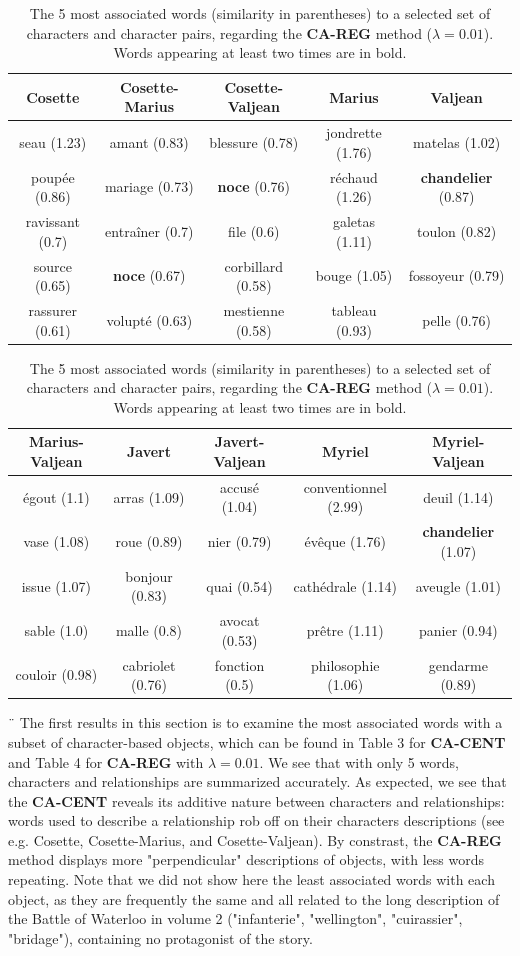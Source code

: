 \documentclass[
twocolumn,
]{ceurart}
\begin{document}
\begin{table}[!bh]
	\centering
	\begin{tabular}{|c|c|c|c|c|}
		\hline
		Cosette & Cosette-Marius & Cosette-Valjean & Marius & Valjean \\ \hline
		seau (1.23) & amant (0.83) & blessure (0.78) & jondrette (1.76) & matelas (1.02) \\ \hline
		poupée (0.86) & mariage (0.73) & \textbf{noce} (0.76) & réchaud (1.26) & \textbf{chandelier} (0.87) \\ \hline
		ravissant (0.7) & entraîner (0.7) & file (0.6) & galetas (1.11) & toulon (0.82) \\ \hline
		source (0.65) & \textbf{noce} (0.67) & corbillard (0.58) & bouge (1.05) & fossoyeur (0.79) \\ \hline
		rassurer (0.61) & volupté (0.63) & mestienne (0.58) & tableau (0.93) & pelle (0.76) \\ \hline
	\end{tabular}
	
	\begin{tabular}{|c|c|c|c|c|}
		\hline
		Marius-Valjean & Javert & Javert-Valjean & Myriel & Myriel-Valjean \\ \hline
		égout (1.1) & arras (1.09) & accusé (1.04) & conventionnel (2.99) & deuil (1.14) \\ \hline
		vase (1.08) & roue (0.89) & nier (0.79) & évêque (1.76) & \textbf{chandelier} (1.07) \\ \hline
		issue (1.07) & bonjour (0.83) & quai (0.54) & cathédrale (1.14) & aveugle (1.01) \\ \hline
		sable (1.0) & malle (0.8) & avocat (0.53) & prêtre (1.11) & panier (0.94) \\ \hline
		couloir (0.98) & cabriolet (0.76) & fonction (0.5) & philosophie (1.06) & gendarme (0.89) \\ 
		\hline
	\end{tabular}
	
	\label{CA_REG_word_vs_obj}
	\caption{The 5 most associated words (similarity in parentheses) to a selected set of characters and character pairs, regarding the \textbf{CA-REG} method ($\lambda = 0.01$). Words appearing at least two times are in bold.}
\end{table}
¨
The first results in this section is to examine the most associated words with a subset of character-based objects, which can be found in Table 3 for \textbf{CA-CENT} and Table 4 for \textbf{CA-REG} with $\lambda = 0.01$. We see that with only 5 words, characters and relationships are summarized accurately. As expected, we see that the \textbf{CA-CENT} reveals its additive nature between characters and relationships: words used to describe a relationship rob off on their characters descriptions (see e.g. Cosette, Cosette-Marius, and Cosette-Valjean). By constrast, the \textbf{CA-REG} method displays more "perpendicular" descriptions of objects, with less words repeating. Note that we did not show here the least associated words with each object, as they are frequently the same and all related to the long description of the Battle of Waterloo in volume 2 ("infanterie", "wellington", "cuirassier", "bridage"), containing no protagonist of the story. 
\end{document}
